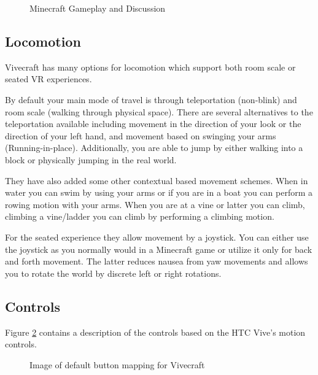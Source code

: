 \documentclass[journal]{IEEEtran}
\begin{document}
\begin{figure}[h]
	\centering
		\caption{Minecraft Gameplay and Discussion}
		\label{Vivecraft_Gameplay}
\end{figure}
\subsection{Locomotion}
Vivecraft has many options for locomotion which support both  room scale or seated VR experiences. 

By default your main mode of travel is through teleportation (non-blink) and room scale (walking through physical space). There are several alternatives to the teleportation available including movement in the direction of your look or the direction of your left hand, and movement based on swinging your arms (Running-in-place). Additionally, you are able to jump by either walking into a block or physically jumping in the real world. 

They have also added some other contextual based movement schemes. When in water you can swim by using your arms or if you are in a boat you can perform a rowing motion with your arms. When you are at a vine or latter you can climb, climbing a vine/ladder you can climb by performing a climbing motion.  

For the seated experience they allow movement by a joystick. You can either use the joystick as you normally would in a Minecraft game or utilize it only for back and forth movement. The latter reduces nausea from yaw movements and allows you to rotate the world by discrete left or right rotations. 

\subsection{Controls}
Figure \ref{vive_craft_controls} contains a description of the controls based on the HTC Vive's motion controls. 
\begin{figure}[H]
	
	\noindent
	\caption{Image of default button mapping for Vivecraft\cite{vivecraft_controllers}}\label{vive_craft_controls}
\end{figure}
\end{document}
